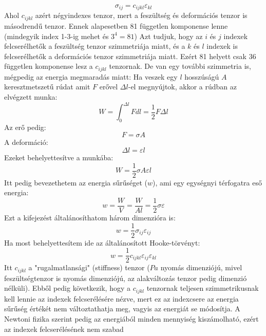 \documentclass[../main.tex]{subfiles}
\begin{document}
\begin{equation}
    \sigma_{ij} = c_{ijkl} \varepsilon_{kl}
\end{equation}
Ahol $c_{ijkl}$ azért négyindexes tenzor, mert a feszültség és deformációs tenzor is másodrendű tenzor. Ennek alapesetben 81 független komponense lenne (mindegyik index 1-3-ig mehet és $3^4 = 81$) Azt tudjuk, hogy az $i$ és $j$ indexek felcserélhetők a feszültség tenzor szimmetriája miatt, és a $k$ és $l$ indexek is felcserélhetők
a deformációs tenzor szimmetriája miatt. Ezért 81 helyett csak 36 független komponense lesz a $c_{ijkl}$ tenzornak. De van egy további szimmetria is, mégpedig az energia megmaradás miatt:
\newline
Ha veszek egy $l$ hosszúságú $A$ keresztmetszetű rúdat amit $F$ erővel $\Delta l$-el megnyújtok, akkor a rúdban az elvégzett munka:
\begin{equation}
    W = \int_0^{\Delta l} F dl = \frac{1}{2} F \Delta l
\end{equation}
Az erő pedig:
\begin{equation}
    F = \sigma A
\end{equation}
A deformáció:
\begin{equation}
    \Delta l = \varepsilon l
\end{equation}
Ezeket behelyettesítve a munkába:
\begin{equation}
    W = \frac{1}{2} \sigma A \varepsilon l
\end{equation}
Itt pedig bevezethetem az energia sűrűséget ($w$), ami egy egységnyi térfogatra eső energia:
\begin{equation}
    w = \frac{W}{V} = \frac{W}{Al} = \frac{1}{2} \sigma \varepsilon
\end{equation}
Ezt a kifejezést általánosíthatom három dimenzióra is:
\begin{equation}
    w = \frac{1}{2} \sigma_{ij} \varepsilon_{ij}
\end{equation}
Ha most behelyettesítem ide az általánosított Hooke-törvényt:
\begin{equation}
    w = \frac{1}{2} c_{ijkl} \varepsilon_{ij} \varepsilon_{kl}
\end{equation}
Itt $c_{ijkl}$ a "rugalmatlansági" (stiffness) tenzor ($Pa$ nyomás dimenziójú, mivel feszültségtenzor is nyomás dimenziójú, az alakváltozás tenzor pedig dimenzió nélküli). Ebből pedig következik, hogy a $c_{ijkl}$ tenzornak teljesen szimmetrikusnak kell lennie az indexek felcserélésére nézve, mert ez az indexcsere az energia sűrűség
értékét nem változtathatja meg, vagyis az energiát se módosítja. A Newtoni fizika szerint pedig az energiából minden mennyiség kiszámolható, ezért az indexek felcserélésének nem szabad
\end{document}
